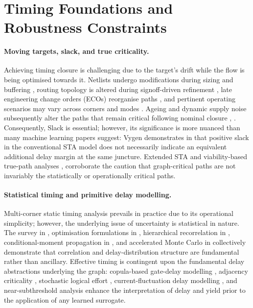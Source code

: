 \documentclass[num-refs]{wiley-article}
\begin{document}
  \section{Timing Foundations and Robustness Constraints}

  \paragraph{Moving targets, slack, and true criticality.} Achieving timing closure is challenging due to the target's drift while the flow is being optimised towards it. Netlists undergo modifications during sizing and buffering \cite{ref1}, routing topology is altered during signoff-driven refinement \cite{ref7}, late engineering change orders (ECOs) reorganise paths \cite{ref19}, and pertinent operating scenarios may vary across corners and modes \cite{ref16}. Ageing and dynamic supply noise subsequently alter the paths that remain critical following nominal closure \cite{ref12}, \cite{ref23}. Consequently, Slack is essential; however, its significance is more nuanced than many machine learning papers suggest: Vygen demonstrates in \cite{ref50} that positive slack in the conventional STA model does not necessarily indicate an equivalent additional delay margin at the same juncture. Extended STA and viability-based true-path analyses \cite{ref37}, \cite{ref40} corroborate the caution that graph-critical paths are not invariably the statistically or operationally critical paths.


  \paragraph{Statistical timing and primitive delay modelling.} Multi-corner static timing analysis prevails in practice due to its operational simplicity; however, the underlying issue of uncertainty is statistical in nature. The survey in \cite{ref49}, optimisation formulations in \cite{ref18}, hierarchical recorrelation in \cite{ref43}, conditional-moment propagation in \cite{ref45}, and accelerated Monte Carlo in \cite{ref47} collectively demonstrate that correlation and delay-distribution structure are fundamental rather than ancillary. Effective timing is contingent upon the fundamental delay abstractions underlying the graph: copula-based gate-delay modelling \cite{ref32}, adjacency criticality \cite{ref35}, stochastic logical effort \cite{ref41}, current-fluctuation delay modelling \cite{ref42}, and near-subthreshold analysis \cite{ref36} enhance the interpretation of delay and yield prior to the application of any learned surrogate.
\end{document}
